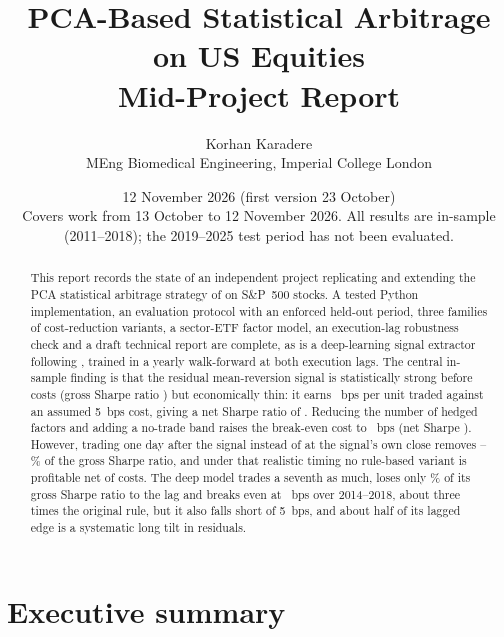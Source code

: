 \documentclass[11pt,a4paper]{article}
\title{PCA-Based Statistical Arbitrage on US Equities\\[2pt]
\large Mid-Project Report}
\author{Korhan Karadere\\ \small MEng Biomedical Engineering, Imperial College London}
\date{12 November 2026 (first version 23 October)\\ \small Covers work from 13 October to 12 November 2026. All results are in-sample (2011--2018);
the 2019--2025 test period has not been evaluated.}
\begin{document}
\maketitle

\begin{abstract}
\noindent This report records the state of an independent project replicating and extending the
PCA statistical arbitrage strategy of \citet{avellaneda2010} on S\&P~500 stocks. A tested
Python implementation, an evaluation protocol with an enforced held-out period, three families
of cost-reduction variants, a sector-ETF factor model, an execution-lag robustness check and a
draft technical report are complete, as is a deep-learning signal extractor following
\citet{guijarro2021}, trained in a yearly walk-forward at both execution lags. The central
in-sample finding is that the residual mean-reversion signal is statistically strong before
costs (gross Sharpe ratio \MPBaseGrossSR{}) but economically thin: it earns \MPBaseBE{}~bps per
unit traded against an assumed 5~bps cost, giving a net Sharpe ratio of \MPBaseNetSR{}. Reducing
the number of hedged factors and adding a no-trade band raises the break-even cost to
\MPBestBE{}~bps (net Sharpe \MPBestNetSR{}). However, trading one day after the signal instead of
at the signal's own close removes \MPLagLossBest--\MPLagLossBase\% of the gross Sharpe ratio, and
under that realistic timing no rule-based variant is profitable net of costs. The deep model
trades a seventh as much, loses only \DeepLagLoss\% of its gross Sharpe ratio to the lag and breaks
even at \DeepLagBE~bps over 2014--2018, about three times the original rule, but it also falls short
of 5~bps, and about half of its lagged edge is a systematic long tilt in residuals.
\end{abstract}

\tableofcontents
\newpage

\section{Executive summary}
\label{sec:summary}
\end{document}
